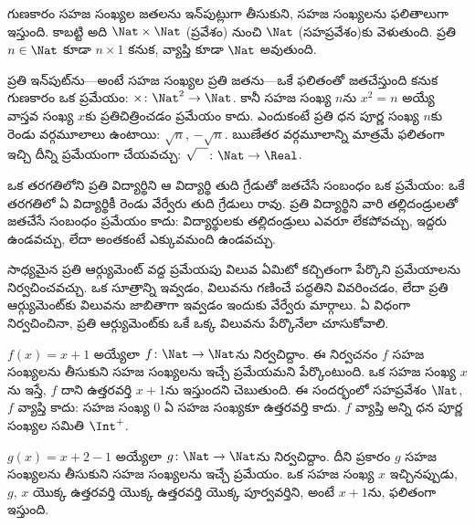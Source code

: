 \documentclass[../../../include/open-logic-section]{subfiles}
\begin{document}
\begin{ex}
గుణకారం సహజ సంఖ్యల జతలను ఇన్‌పుట్లుగా తీసుకుని, సహజ సంఖ్యలను
ఫలితాలుగా ఇస్తుంది. కాబట్టి అది $\Nat \times \Nat$ (ప్రవేశం)
నుంచి $\Nat$ (సహప్రవేశం)కు వెళుతుంది. ప్రతి $n \in \Nat$ కూడా
$n \times 1$ కనుక, వ్యాప్తి కూడా $\Nat$ అవుతుంది.
\end{ex}

\begin{ex}
ప్రతి ఇన్‌పుట్‌ను---అంటే సహజ సంఖ్యల ప్రతి జతను---ఒకే ఫలితంతో
జతచేస్తుంది కనుక గుణకారం ఒక ప్రమేయం:
$\times \colon \Nat^2 \to \Nat$.
కానీ సహజ సంఖ్య $n$ను $x^2 = n$ అయ్యే వాస్తవ సంఖ్య $x$కు
ప్రతిచిత్రించడం ప్రమేయం కాదు. ఎందుకంటే ప్రతి ధన పూర్ణ సంఖ్య $n$కు
రెండు వర్గమూలాలు ఉంటాయి: $\sqrt{n}$, $-\sqrt{n}$.
ఋణేతర వర్గమూలాన్ని మాత్రమే ఫలితంగా ఇచ్చి దీన్ని ప్రమేయంగా చేయవచ్చు:
$\sqrt{\phantom{X}} \colon \Nat \to \Real$.
\end{ex}

\begin{ex}
ఒక తరగతిలోని ప్రతి విద్యార్థిని ఆ విద్యార్థి తుది గ్రేడుతో జతచేసే
సంబంధం ఒక ప్రమేయం: ఒకే తరగతిలో ఏ విద్యార్థికీ రెండు వేర్వేరు తుది
గ్రేడులు రావు. ప్రతి విద్యార్థిని వారి తల్లిదండ్రులతో జతచేసే సంబంధం
ప్రమేయం కాదు: విద్యార్థులకు తల్లిదండ్రులు ఎవరూ లేకపోవచ్చు, ఇద్దరు
ఉండవచ్చు, లేదా అంతకంటే ఎక్కువమంది ఉండవచ్చు.
\end{ex}

\begin{explain}
సాధ్యమైన ప్రతి ఆర్గ్యుమెంట్ వద్ద ప్రమేయపు విలువ ఏమిటో కచ్చితంగా
పేర్కొని ప్రమేయాలను నిర్వచించవచ్చు. ఒక సూత్రాన్ని ఇవ్వడం, విలువను
గణించే పద్ధతిని వివరించడం, లేదా ప్రతి ఆర్గ్యుమెంట్‌కు విలువను
జాబితాగా ఇవ్వడం ఇందుకు వేర్వేరు మార్గాలు. ఏ విధంగా నిర్వచించినా,
ప్రతి ఆర్గ్యుమెంట్‌కు ఒకే ఒక్క విలువను పేర్కొనేలా చూసుకోవాలి.
\end{explain}

\begin{ex}
$f(x) = x+1$ అయ్యేలా $f \colon \Nat \to \Nat$ను నిర్వచిద్దాం.
ఈ నిర్వచనం $f$ సహజ సంఖ్యలను తీసుకుని సహజ సంఖ్యలను ఇచ్చే ప్రమేయమని
పేర్కొంటుంది. ఒక సహజ సంఖ్య $x$ను ఇస్తే, $f$ దాని ఉత్తరవర్తి $x+1$ను
ఇస్తుందని చెబుతుంది. ఈ సందర్భంలో సహప్రవేశం $\Nat$, $f$ వ్యాప్తి కాదు:
సహజ సంఖ్య $0$ ఏ సహజ సంఖ్యకూ ఉత్తరవర్తి కాదు.
$f$ వ్యాప్తి అన్ని ధన పూర్ణ సంఖ్యల సమితి $\Int^{+}$.
\end{ex}

\begin{ex}
$g(x) = x+2-1$ అయ్యేలా $g \colon \Nat \to \Nat$ను నిర్వచిద్దాం.
దీని ప్రకారం $g$ సహజ సంఖ్యలను తీసుకుని సహజ సంఖ్యలను ఇచ్చే ప్రమేయం.
ఒక సహజ సంఖ్య $x$ ఇచ్చినప్పుడు, $g$, $x$ యొక్క ఉత్తరవర్తి యొక్క
ఉత్తరవర్తి యొక్క పూర్వవర్తిని, అంటే $x+1$ను, ఫలితంగా ఇస్తుంది.
\end{ex}
\end{document}
